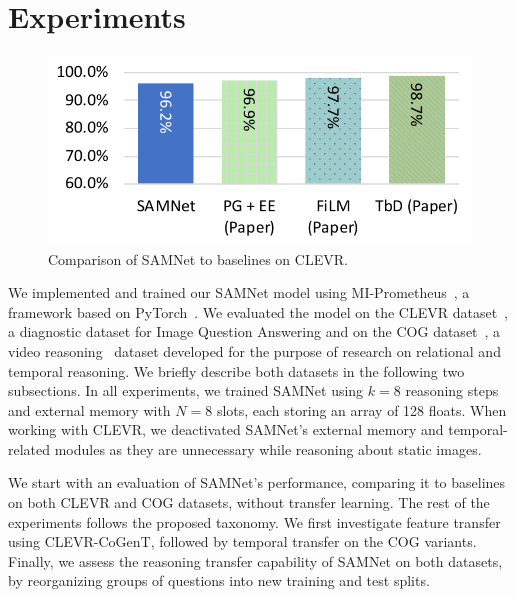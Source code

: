 \section{Experiments}
\label{sec:experiments}

\begin{figure}[b!]
	\centering
	\includegraphics[width=0.5\columnwidth]{../img/plots/clevr_baselines.pdf}
	\caption{Comparison of SAMNet to baselines on CLEVR.}
	\label{fig:clevr_baselines}
\end{figure}


We implemented and trained our SAMNet model using MI-Prometheus~\cite{kornuta2018accelerating}, a framework based on PyTorch~\cite{paszke2017automatic}.
We evaluated the model on
the CLEVR dataset~\cite{johnson2017clevr}, a diagnostic dataset for Image Question Answering and on the COG dataset~\cite{yang2018dataset}, a video reasoning~\cite{mogadala2019trends} dataset developed for the purpose of research on relational and temporal reasoning.
We briefly describe both datasets in the following two subsections.
In all experiments, we trained SAMNet using $k = 8$ reasoning steps and external memory with $N = 8$ slots, each storing an array of 128 floats.
When working with CLEVR, we deactivated SAMNet's external memory and temporal-related modules as they are unnecessary while reasoning about static images.

We start with an evaluation of SAMNet's performance, comparing it to baselines on both CLEVR and COG datasets, without transfer learning.
The rest of the experiments follows the proposed taxonomy.
We first investigate feature transfer using CLEVR-CoGenT, followed by temporal transfer on the COG variants. Finally, we assess the reasoning transfer capability of SAMNet on both datasets, by reorganizing groups of questions into new training and test splits.

